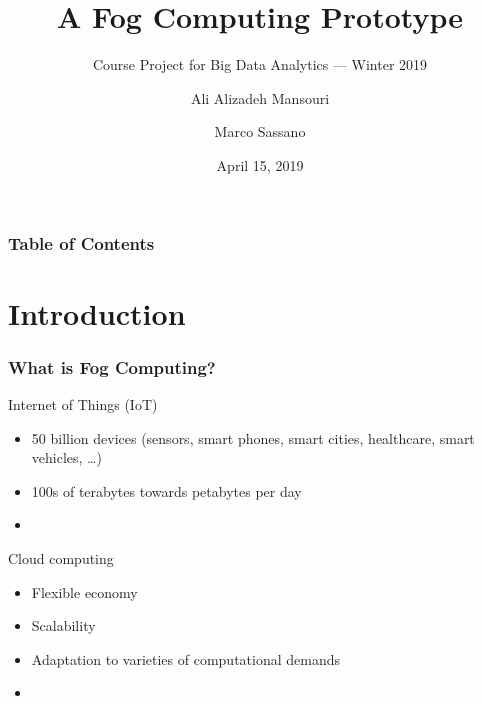 \documentclass[xelatex,usenames,dvipsnames]{beamer}
\title[Crisis] %
{A Fog Computing Prototype}
\subtitle{Course Project for Big Data Analytics --- Winter 2019}
\author[Ali, Marco] %
{Ali Alizadeh Mansouri \and Marco Sassano}
\institute[Concordia University] %
{
    Concordia University\\
}
\date[April 15, 2019] %
{April 15, 2019}
\begin{document}
\frame{\titlepage}


\begin{frame}
    \frametitle{Table of Contents}
    \tableofcontents
\end{frame}




\section[Introduction]{Introduction}



  \begin{frame}
    \frametitle{What is Fog Computing?}
    \alert{Internet of Things (IoT)}
    
    \begin{itemize}
      \item 50 billion devices (sensors, smart phones, smart cities, healthcare, smart vehicles, \ldots) %
      \item 100s of terabytes towards petabytes per day 
      \item {\color{RedOrange}{limited computing resources}}
    \end{itemize} 

    \pause

    \alert{Cloud computing}
    \begin{itemize}
      \item Flexible economy
      \item Scalability
      \item Adaptation to varieties of computational demands
      \item {\color{RedOrange}{Suffers from high latency}}
    \end{itemize}
  \end{frame}
\end{document}
